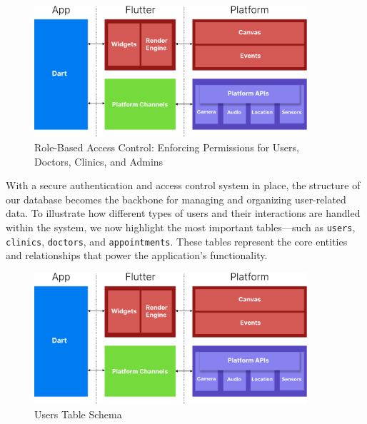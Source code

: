 \documentclass[12pt]{report}
\begin{document}
\vspace{0.5cm}

\begin{figure}[H]
    \centering
    \includegraphics[width=0.9\textwidth]{images/FlutterDiagram@2x.pdf}
    \caption{Role-Based Access Control: Enforcing Permissions for Users, Doctors, Clinics, and Admins}
\end{figure}

\vspace{0.5cm}

With a secure authentication and access control system in place, the structure of our database becomes the backbone for managing and organizing user-related data. To illustrate how different types of users and their interactions are handled within the system, we now highlight the most important tables—such as \texttt{users}, \texttt{clinics}, \texttt{doctors}, and \texttt{appointments}. These tables represent the core entities and relationships that power the application’s functionality.

\vspace{0.5cm}

\begin{figure}[H]
    \centering
    \includegraphics[width=0.9\textwidth]{images/FlutterDiagram@2x.pdf}
    \caption{Users Table Schema}
\end{figure}

\vspace{0.5cm}
\end{document}
